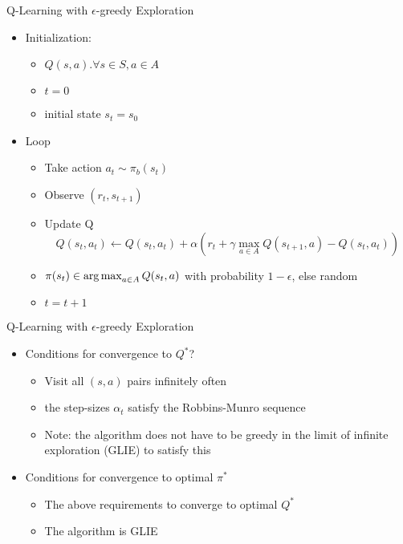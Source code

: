 \begin{frame}[c]{Q-Learning with $\epsilon$-greedy Exploration}
	
	\begin{itemize}
		\item Initialization:
		\begin{itemize}
			\item $Q(s,a). \forall s \in S, a \in A$
			\item $t=0$
			\item initial state $s_t = s_0$
		\end{itemize} 
		\item Loop
		\begin{itemize}
			\item Take action $a_{t} \sim \pi_b(s_{t})$ 
			\item Observe $(r_{t}, s_{t+1})$
			\item Update Q 
			$$Q(s_t,a_t) \gets Q(s_t, a_t) + \alpha (r_t + \gamma \max_{a\in A} Q(s_{t+1}, a) - Q(s_t, a_t))$$
			\item $\pi(s_t) \in \operatorname*{arg\,max}_{a\in A} Q(s_t, a)$ with probability $1-\epsilon$, else random
			\item $t = t+1$
		\end{itemize} 
	\end{itemize}
	
\end{frame}
\begin{frame}[c]{Q-Learning with $\epsilon$-greedy Exploration}
	
	\begin{itemize}
		\item Conditions for convergence to $Q^*$?
		\begin{itemize}
			\item Visit all $(s, a)$ pairs infinitely often
			\item the step-sizes $\alpha_t$ satisfy the Robbins-Munro sequence
			\item Note: the algorithm does not have to be greedy in the limit of infinite exploration (GLIE) to satisfy this
		\end{itemize}
		\bigskip
		\item Conditions for convergence to optimal $\pi^*$
		\begin{itemize}
			\item The above requirements to converge to optimal $Q^*$
			\item The algorithm is GLIE
		\end{itemize}
	\end{itemize}
	
\end{frame}

